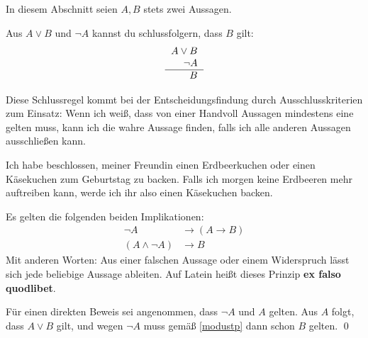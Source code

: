 In diesem Abschnitt seien $A,B$ stets zwei Aussagen.


\begin{axiom} \label{modustp}
    Aus $A\lor B$ und $\neg A$ kannst du schlussfolgern, dass $B$ gilt:
    \[\begin{tabular}{r}
        $A\lor B$ \\
        $\neg A$ \\
        \hline 
        $B$
    \end{tabular} \]
\end{axiom}


\begin{bem}
    Diese Schlussregel kommt bei der Entscheidungsfindung durch Ausschlusskriterien zum Einsatz: Wenn ich weiß, dass von einer Handvoll Aussagen mindestens eine gelten muss, kann ich die wahre Aussage finden, falls ich alle anderen Aussagen ausschließen kann.
\end{bem}


\begin{bsp}
    Ich habe beschlossen, meiner Freundin einen Erdbeerkuchen oder einen Käsekuchen zum Geburtstag zu backen. Falls ich morgen keine Erdbeeren mehr auftreiben kann, werde ich ihr also einen Käsekuchen backen.
\end{bsp}


\begin{satz} \label{exfalso} 
    Es gelten die folgenden beiden Implikationen:
    \begin{align*}
        \neg A & \to (A\to B) \\
        (A\land \neg A) & \to B
    \end{align*}
    Mit anderen Worten: Aus einer falschen Aussage oder einem Widerspruch lässt sich jede beliebige Aussage ableiten. Auf Latein heißt dieses Prinzip \textbf{ex falso quodlibet}.
\end{satz}


\begin{bew}
    Für einen direkten Beweis sei angenommen, dass $\neg A$ und $A$ gelten. Aus $A$ folgt, dass $A\lor B$ gilt, und wegen $\neg A$ muss gemäß \cref{modustp} dann schon $B$ gelten. \qed
\end{bew}


